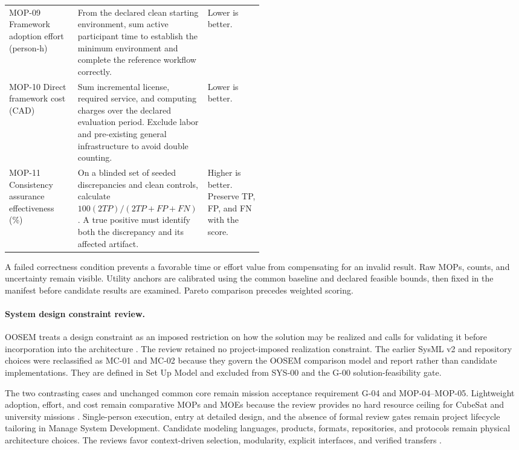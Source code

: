 \documentclass[11pt,a4paper]{article}
\begin{document}
\begin{table}[H]
\begin{tabularx}{\linewidth}{>{\raggedright\arraybackslash}p{0.27\linewidth} X >{\raggedright\arraybackslash}p{0.22\linewidth}}
        MOP-09 Framework adoption effort (person-h) & From the declared clean starting environment, sum active participant time to establish the minimum environment and complete the reference workflow correctly. & Lower is better. \\
        MOP-10 Direct framework cost (CAD) & Sum incremental license, required service, and computing charges over the declared evaluation period. Exclude labor and pre-existing general infrastructure to avoid double counting. & Lower is better. \\
        MOP-11 Consistency assurance effectiveness (\%) & On a blinded set of seeded discrepancies and clean controls, calculate $100(2TP)/(2TP+FP+FN)$. A true positive must identify both the discrepancy and its affected artifact. & Higher is better. Preserve TP, FP, and FN with the score. \\
        \bottomrule
    \end{tabularx}
\end{table}

A failed correctness condition prevents a favorable time or effort value from compensating for an invalid result. Raw MOPs, counts, and uncertainty remain visible. Utility anchors are calibrated using the common baseline and declared feasible bounds, then fixed in the manifest before candidate results are examined. Pareto comparison precedes weighted scoring.

\paragraph{System design constraint review.}
OOSEM treats a design constraint as an imposed restriction on how the solution may be realized and calls for validating it before incorporation into the architecture \citep[Sec.~17.3.3]{friedenthal2014practical}. The review retained no project-imposed realization constraint. The earlier SysML v2 and repository choices were reclassified as MC-01 and MC-02 because they govern the OOSEM comparison model and report rather than candidate implementations. They are defined in Set Up Model and excluded from SYS-00 and the G-00 solution-feasibility gate.

The two contrasting cases and unchanged common core remain mission acceptance requirement G-04 and MOP-04--MOP-05. Lightweight adoption, effort, and cost remain comparative MOPs and MOEs because the review provides no hard resource ceiling for CubeSat and university missions \citep[Sec.~5.1 and Table~5]{buruso2026modelbased}. Single-person execution, entry at detailed design, and the absence of formal review gates remain project lifecycle tailoring in Manage System Development. Candidate modeling languages, products, formats, repositories, and protocols remain physical architecture choices. The reviews favor context-driven selection, modularity, explicit interfaces, and verified transfers \citep[Sec.~5.1]{buruso2026modelbased} \citep[Table~13]{rostamnia2026digitaltwin} \citep[Sec.~4.2.3]{rojasramirez2022comparative}.
\end{document}
